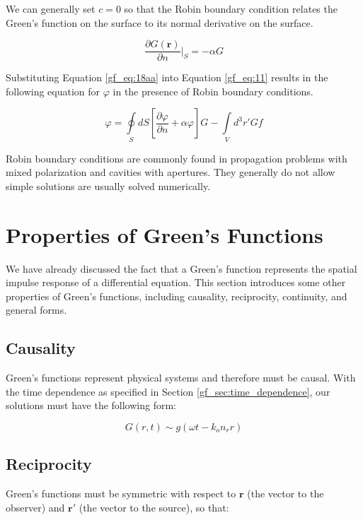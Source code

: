 We can generally set $c=0$ so that the Robin boundary condition relates the Green's function on the surface to its normal derivative on the surface.

\begin{equation}
\frac{\partial G\left(\mathbf{r}\right)}{\partial n}\bigg|_{S} = -\alpha G
\label{gf_eq:18aa}
\end{equation}
\renewcommand{\baselinestretch}{2} \small\normalsize

Substituting Equation \ref{gf_eq:18aa} into Equation \ref{gf_eq:11} results in the following equation for $\varphi$ in the presence of Robin boundary conditions.

\begin{equation}
\boxed{\varphi = \oint\limits_{S}dS\left[\frac{\partial \varphi}{\partial n} + \alpha\varphi \right]G -\int\limits_{V}d^3r' Gf}
\label{gf_eq:18aabb}
\end{equation}
\renewcommand{\baselinestretch}{2} \small\normalsize

Robin boundary conditions are commonly found in propagation problems with mixed polarization and cavities with apertures. They generally do not allow simple solutions are usually solved numerically.

\section {Properties of Green's Functions} \label{gf_sec:properties}
We have already discussed the fact that a Green's function represents the spatial impulse response of a differential equation. This section introduces some other properties of Green's functions, including causality, reciprocity, continuity, and general forms.

\subsection {Causality} \label{gf_sec:causality}
Green's functions represent physical systems and therefore must be causal. With the time dependence as specified in Section \ref{gf_sec:time_dependence}, our solutions must have the following form:

\begin{equation}
G\left(r,t\right) \sim g\left(\omega t - k_on_rr\right)
\label{gf_eq:18a}
\end{equation}
\renewcommand{\baselinestretch}{2} \small\normalsize

\subsection {Reciprocity} \label{gf_sec:reciprocity}
Green's functions must be symmetric with respect to $\mathbf{r}$ (the vector to the observer) and $\mathbf{r}'$ (the vector to the source), so that:

